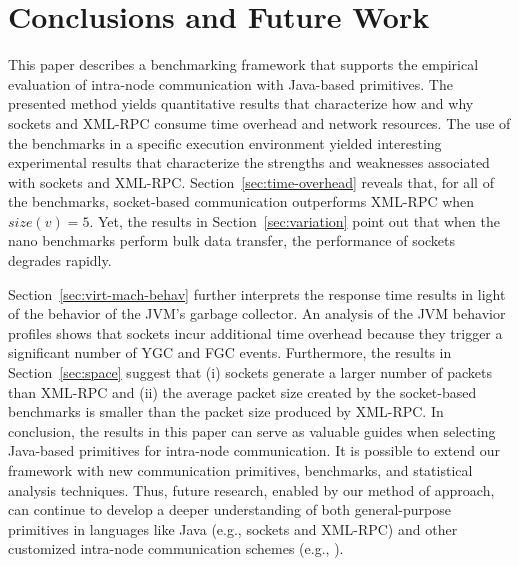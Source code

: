 \documentclass{sig-alternate}
\begin{document}

\vspace*{-.1in}
\section{Conclusions and Future Work}
\label{sec:conclusions}

This paper describes a benchmarking framework that supports the
empirical evaluation of intra-node communication with Java-based
primitives.  The presented method yields quantitative results that
characterize how and why sockets and XML-RPC consume time overhead and
network resources.  The use of the benchmarks in a specific execution
environment yielded interesting experimental results that characterize
the strengths and weaknesses associated with sockets and XML-RPC.
Section~\ref{sec:time-overhead} reveals that, for all of the
benchmarks, socket-based communication outperforms XML-RPC when
$size(v)=5$.  Yet, the results in Section~\ref{sec:variation} point
out that when the nano benchmarks perform bulk data transfer, the
performance of sockets degrades rapidly.




Section~\ref{sec:virt-mach-behav} further interprets the response time
results in light of the behavior of the JVM's garbage collector.  An
analysis of the JVM behavior profiles shows that sockets incur
additional time overhead because they trigger a significant number of
YGC and FGC events.  Furthermore, the results in
Section~\ref{sec:space} suggest that (i) sockets generate a larger
number of packets than XML-RPC and (ii) the average packet size
created by the socket-based benchmarks is smaller than the packet size
produced by XML-RPC.  In conclusion, the results in this paper can
serve as valuable guides when selecting Java-based primitives for
intra-node communication.  It is possible to extend our framework with
new communication primitives, benchmarks, and statistical analysis
techniques. Thus, future research, enabled by our method of approach,
can continue to develop a deeper understanding of both general-purpose
primitives in languages like Java (e.g., sockets and XML-RPC) and
other customized intra-node communication schemes (e.g.,
\cite{tanenbaum-minix3,herder-microkernel,tang-code-complex,vaidyanathan-grid}).
\end{document}
